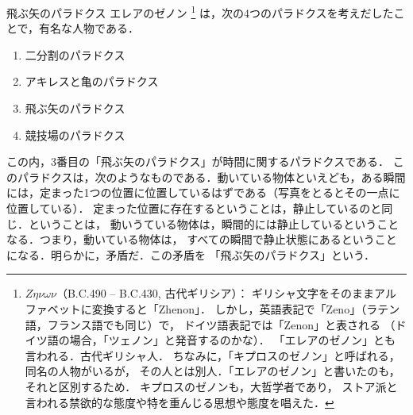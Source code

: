             \begin{memo}{飛ぶ矢のパラドクス}
                エレアのゼノン
                    \footnote{
                        $Z\eta \nu \omega \nu$（B.C.490 -- B.C.430, 古代ギリシア）：
                        ギリシャ文字をそのままアルファベットに変換すると「Zhenon」．
                        しかし，英語表記で「Zeno」（ラテン語，フランス語でも同じ）で，
                        ドイツ語表記では「Zenon」と表される
                        （ドイツ語の場合，「ツェノン」と発音するのかな）．
                        「エレアのゼノン」とも言われる．古代ギリシャ人．
                        ちなみに，「キプロスのゼノン」と呼ばれる，同名の人物がいるが，
                        その人とは別人．「エレアのゼノン」と書いたのも，それと区別するため．
                        キプロスのゼノンも，大哲学者であり，
                        ストア派と言われる禁欲的な態度や特を重んじる思想や態度を唱えた．
                    }
                は，次の4つのパラドクスを考えだしたことで，有名な人物である．
                    \begin{enumerate}
                        \item 二分割のパラドクス
                        \item アキレスと亀のパラドクス
                        \item 飛ぶ矢のパラドクス
                        \item 競技場のパラドクス
                    \end{enumerate}
                この内，3番目の「飛ぶ矢のパラドクス」が時間に関するパラドクスである．
                このパラドクスは，次のようなものである．動いている物体といえども，ある瞬間
                には，定まった1つの位置に位置しているはずである（写真をとるとその一点に位置している）．
                定まった位置に存在するということは，静止しているのと同じ．ということは，
                動いうている物体は，瞬間的には静止しているということなる．つまり，動いている物体は，
                すべての瞬間で静止状態にあるということになる．明らかに，矛盾だ．この矛盾を
                「飛ぶ矢のパラドクス」という．
            \end{memo}

